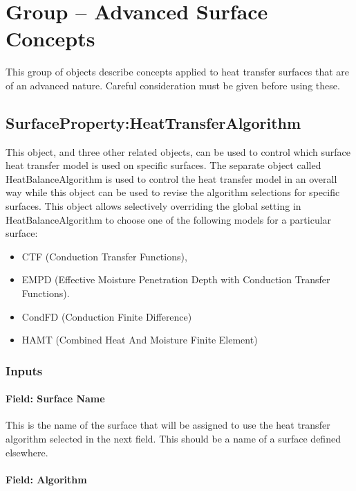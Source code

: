 \section{Group -- Advanced Surface Concepts}\label{group-advanced-surface-concepts}

This group of objects describe concepts applied to heat transfer surfaces that are of an advanced nature. Careful consideration must be given before using these.

\subsection{SurfaceProperty:HeatTransferAlgorithm}\label{surfacepropertyheattransferalgorithm}

This object, and three other related objects, can be used to control which surface heat transfer model is used on specific surfaces. The separate object called HeatBalanceAlgorithm is used to control the heat transfer model in an overall way while this object can be used to revise the algorithm selections for specific surfaces. This object allows selectively overriding the global setting in HeatBalanceAlgorithm to choose one of the following models for a particular surface:

\begin{itemize}
\item
  CTF (Conduction Transfer Functions),
\item
  EMPD (Effective Moisture Penetration Depth with Conduction Transfer Functions).
\item
  CondFD (Conduction Finite Difference)
\item
  HAMT (Combined Heat And Moisture Finite Element)
\end{itemize}

\subsubsection{Inputs}\label{inputs-000}

\paragraph{Field: Surface Name}\label{field-surface-name}

This is the name of the surface that will be assigned to use the heat transfer algorithm selected in the next field. This should be a name of a surface defined elsewhere.

\paragraph{Field: Algorithm}\label{field-algorithm}

